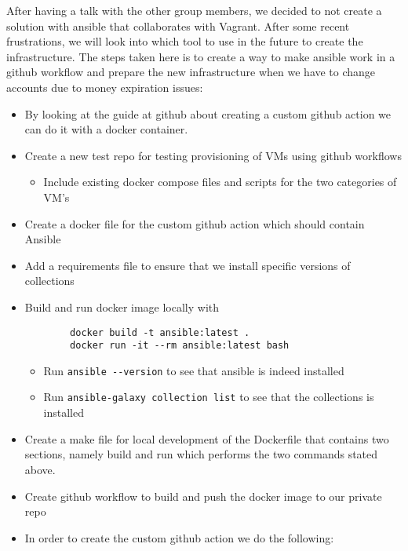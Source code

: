 After having a talk with the other group members, we decided to not
create a solution with ansible that collaborates with Vagrant. After
some recent frustrations, we will look into which tool to use in the
future to create the infrastructure. The steps taken here is to create a
way to make ansible work in a github workflow and prepare the new
infrastructure when we have to change accounts due to money expiration
issues:

\begin{itemize}
\item By looking at the guide at github about creating a custom github action we can do it with a docker container.
\item Create a new test repo for testing provisioning of VMs using github workflows

    \begin{itemize}
        \item Include existing docker compose files and scripts for the two categories of VM's
    \end{itemize}
    \item Create a docker file for the custom github action which should contain Ansible
    \item Add a requirements file to ensure that we install specific versions of collections
    \item Build and run docker image locally with

    \begin{verbatim}
        docker build -t ansible:latest .
        docker run -it --rm ansible:latest bash
    \end{verbatim}

    \begin{itemize}
        \item Run \texttt{ansible\ -\/-version} to see that ansible is indeed installed
        \item Run \texttt{ansible-galaxy\ collection\ list} to see that the collections is installed
    \end{itemize}
    \item Create a make file for local development of the Dockerfile that contains two sections, namely build and run which performs the two commands stated above.
    \item Create github workflow to build and push the docker image to our private repo
    \item In order to create the custom github action we do the following:


\end{itemize}
